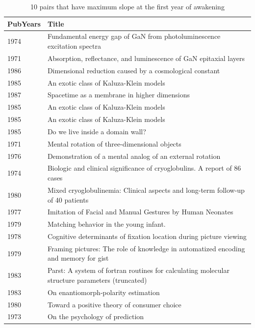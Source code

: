 \documentclass[utf8]{frontiersSCNS}
\begin{document}
\begin{table}[ht]
\caption{10 pairs that have maximum slope at the first year of awakening}%
\centering %
\begin{center}
\begin{tabular}{ll} 
\hline %
PubYears & Title \\
\hline 
1974 & \tiny{Fundamental energy gap of GaN from photoluminescence excitation spectra} \\
1971 &  \tiny{Absorption, reflectance, and luminescence of GaN epitaxial layers} \\
\hline
1986 & \tiny{Dimensional reduction caused by a cosmological constant} \\
1985 & \tiny{An exotic class of Kaluza-Klein models} \\
\hline
1987 & \tiny{Spacetime as a membrane in higher dimensions} \\
1985 & \tiny{An exotic class of Kaluza-Klein models} \\
\hline 
1985 & \tiny{An exotic class of Kaluza-Klein models} \\
1985 & \tiny{Do we live inside a domain wall?} \\
\hline
1971 & \tiny{Mental rotation of three-dimensional objects} \\
1976 & \tiny{Demonstration of a mental analog of an external rotation} \\
\hline
1974 & \tiny{Biologic and clinical significance of cryoglobulins. A report of 86 cases} \\
1980 & \tiny{Mixed cryoglobulinemia: Clinical aspects and long-term follow-up of 40 patients} \\
\hline
1977 & \tiny{Imitation of Facial and Manual Gestures by Human Neonates} \\
1979 & \tiny{Matching behavior in the young infant.} \\ 
\hline
1978 & \tiny{Cognitive determinants of fixation location during picture viewing} \\
1979 & \tiny{Framing pictures: The role of knowledge in automatized encoding and memory for gist} \\
\hline
1983 & \tiny{Parst: A system of fortran routines for calculating molecular structure parameters (truncated)} \\
1983 & \tiny{On enantiomorph‐polarity estimation} \\
\hline
1980 & \tiny{Toward a positive theory of consumer choice} \\
1973 & \tiny{On the psychology of prediction} \\
\hline 
\end{tabular}
\end{center}
\label{tab:table3} %
\end{table}
\end{document}
